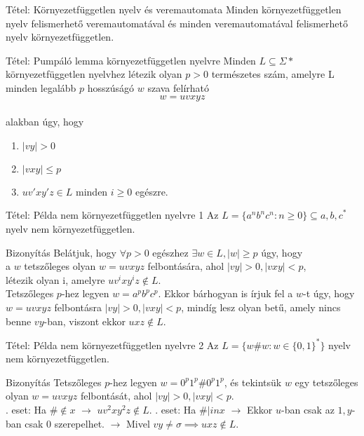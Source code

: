 \documentclass{beamer}
\begin{document}
\begin{frame}
\begin{block}{Tétel: Környezetfüggetlen nyelv és veremautomata}
Minden környezetfüggetlen nyelv felismerhető veremautomatával és minden veremautomatával felismerhető nyelv környezetfüggetlen.
\end{block}

\begin{block}{Tétel: Pumpáló lemma környezetfüggetlen nyelvre}
Minden $L \subseteq {\Sigma}*$ környezetfüggetlen nyelvhez létezik olyan $p > 0$ természetes szám, amelyre L minden legalább $p$ hosszúságó $w$ szava felírható $$w = uvxyz$$\\
alakban úgy, hogy\\
\begin{enumerate}
\item $|vy| > 0$
\item $|vxy| \leq p$
\item $uv'xy'z \in L$ minden $i \geq 0$ egészre.
\end{enumerate}

\end{block}
\end{frame}

\begin{frame}
\begin{block}{Tétel: Példa nem környezetfüggetlen nyelvre 1}
Az $L = \{a^nb^nc^n : n \geq 0 \} \subseteq {a, b, c}^*$ nyelv nem környezetfüggetlen.
\end{block}

\begin{block}{Bizonyítás}
Belátjuk, hogy ${\forall}p > 0$ egészhez ${\exists}w \in L, |w| \geq p$ úgy, hogy\\
a $w$ tetszőleges olyan $w = uvxyz$ felbontására, ahol $|vy| > 0, |vxy| < p$,\\
létezik olyan i, amelyre $uv^ixy^iz \notin L$.\\
Tetszőleges $p$-hez legyen $w = a^pb^pc^p$. Ekkor bárhogyan is írjuk fel a $w$-t úgy, hogy $w = uvxyz$ felbontásra $|vy| > 0, |vxy| < p$, mindíg lesz olyan betű, amely nincs benne $vy$-ban, viszont ekkor $uxz \notin L$.
\end{block}
\end{frame}

\begin{frame}
\begin{block}{Tétel: Példa nem környezetfüggetlen nyelvre 2}
Az $L = \{w\#w : w \in \{0, 1\}^* \}$ nyelv nem környezetfüggetlen.
\end{block}

\begin{block}{Bizonyítás}
Tetszőleges $p$-hez legyen $w = 0^p1^p\#0^p1^p$, és tekintsük $w$ egy tetszőleges olyan $w = uvxyz$ felbontását, ahol $|vy| > 0, |vxy| < p$.\\
. eset: Ha $\# \notin x$ $\rightarrow$ $uv^2xy^2z \notin L$.
. eset: Ha $\# |in x$ $\rightarrow$ Ekkor $u$-ban csak az $1, y$-ban csak $0$ szerepelhet. $\rightarrow$ Mivel $vy \neq \sigma \implies uxz \notin L$.
\end{block}
\end{frame}
\end{document}
